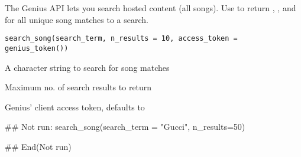 \documentclass[a4paper]{book}
\begin{document}
%
\begin{Description}\relax
The Genius API lets you search hosted content (all songs). Use  to
return , ,  and
 for all unique song matches to a search.
\end{Description}
%
\begin{Usage}
\begin{verbatim}
search_song(search_term, n_results = 10, access_token = genius_token())
\end{verbatim}
\end{Usage}
%
\begin{Arguments}
\begin{ldescription}
\item[\code{search\_term}] A character string to search for song matches

\item[\code{n\_results}] Maximum no. of search results to return

\item[\code{access\_token}] Genius' client access token, defaults to 
\end{ldescription}
\end{Arguments}
%
\begin{Examples}
\begin{ExampleCode}
## Not run: 
search_song(search_term = "Gucci", n_results=50)

## End(Not run)
\end{ExampleCode}
\end{Examples}
\printindex{}
\end{document}

